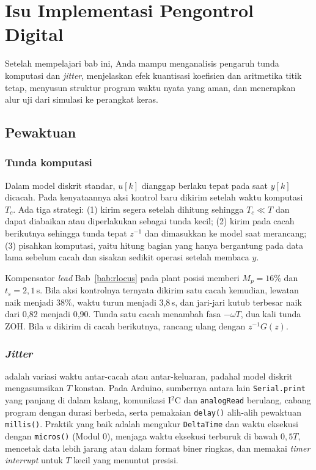 \chapter{Isu Implementasi Pengontrol Digital}
\label{bab:impl}

\begin{tujuan}
	Setelah mempelajari bab ini, Anda mampu menganalisis pengaruh tunda komputasi dan \textit{jitter}, menjelaskan efek kuantisasi koefisien dan aritmetika titik tetap, menyusun struktur program waktu nyata yang aman, dan menerapkan alur uji dari simulasi ke perangkat keras.
\end{tujuan}

\section{Pewaktuan}
\subsection{Tunda komputasi}
Dalam model diskrit standar, $u[k]$ dianggap berlaku tepat pada saat $y[k]$ dicacah. Pada kenyataannya aksi kontrol baru dikirim setelah waktu komputasi $T_c$. Ada tiga strategi: (1) kirim segera setelah dihitung sehingga $T_c \ll T$ dan dapat diabaikan atau diperlakukan sebagai tunda kecil; (2) kirim pada cacah berikutnya sehingga tunda tepat $z^{-1}$ dan dimasukkan ke model saat merancang; (3) pisahkan komputasi, yaitu hitung bagian yang hanya bergantung pada data lama sebelum cacah dan sisakan sedikit operasi setelah membaca $y$.

\begin{contoh}
	Kompensator \textit{lead} Bab~\ref{bab:rlocus} pada plant posisi memberi $M_p = 16\%$ dan $t_s = 2{,}1$\,s. Bila aksi kontrolnya ternyata dikirim satu cacah kemudian, lewatan naik menjadi $38\%$, waktu turun menjadi 3,8\,s, dan jari-jari kutub terbesar naik dari 0,82 menjadi 0,90. Tunda satu cacah menambah fasa $-\omega T$, dua kali tunda ZOH. Bila $u$ dikirim di cacah berikutnya, rancang ulang dengan $z^{-1}G(z)$.
\end{contoh}

\subsection{\textit{Jitter}}
 adalah variasi waktu antar-cacah atau antar-keluaran, padahal model diskrit mengasumsikan $T$ konstan. Pada Arduino, sumbernya antara lain \texttt{Serial.print} yang panjang di dalam kalang, komunikasi I$^2$C dan \texttt{analogRead} berulang, cabang program dengan durasi berbeda, serta pemakaian \texttt{delay()} alih-alih pewaktuan \texttt{millis()}. Praktik yang baik adalah mengukur \texttt{DeltaTime} dan waktu eksekusi dengan \texttt{micros()} (Modul 0), menjaga waktu eksekusi terburuk di bawah $0{,}5T$, mencetak data lebih jarang atau dalam format biner ringkas, dan memakai \textit{timer interrupt} untuk $T$ kecil yang menuntut presisi.

